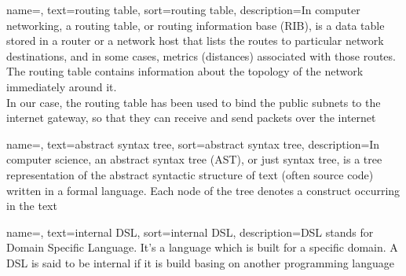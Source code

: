 {
    name=,
    text=routing table,
    sort=routing table,
    description={In computer networking, a routing table, or routing information base (RIB), is a data table stored in a router or a network host that lists the routes to particular network destinations, and in some cases, metrics (distances) associated with those routes. The routing table contains information about the topology of the network immediately around it.\\
    In our case, the routing table has been used to bind the public subnets to the internet gateway, so that they can receive and send packets over the internet}
}

{
    name=,
    text=abstract syntax tree,
    sort=abstract syntax tree,
    description={In computer science, an abstract syntax tree (AST), or just syntax tree, is a tree representation of the abstract syntactic structure of text (often source code) written in a formal language. Each node of the tree denotes a construct occurring in the text}
}

{
    name=,
    text=internal DSL,
    sort=internal DSL,
    description={DSL stands for Domain Specific Language. It’s a language which is built for a specific domain. A DSL is said to be internal if it is build basing on another programming language}
}